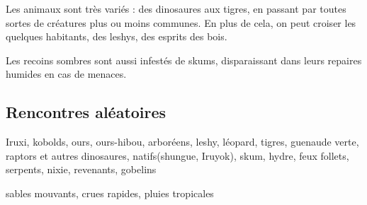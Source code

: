 \documentclass[10pt,a4paper]{book}
\begin{document}
Les animaux sont très variés : des dinosaures aux tigres, en passant par toutes sortes de créatures plus ou moins communes. En plus de cela, on peut croiser les quelques habitants, des leshys, des esprits des bois.

Les recoins sombres sont aussi infestés de skums, disparaissant dans leurs repaires humides en cas de menaces.

\subsection{Rencontres aléatoires}
Iruxi, kobolds, ours, ours-hibou, arboréens, leshy, léopard, tigres, guenaude verte, raptors et autres dinosaures, natifs(shungue, Iruyok), skum, hydre, feux follets, serpents, nixie, revenants, gobelins

sables mouvants, crues rapides, pluies tropicales
\end{document}

